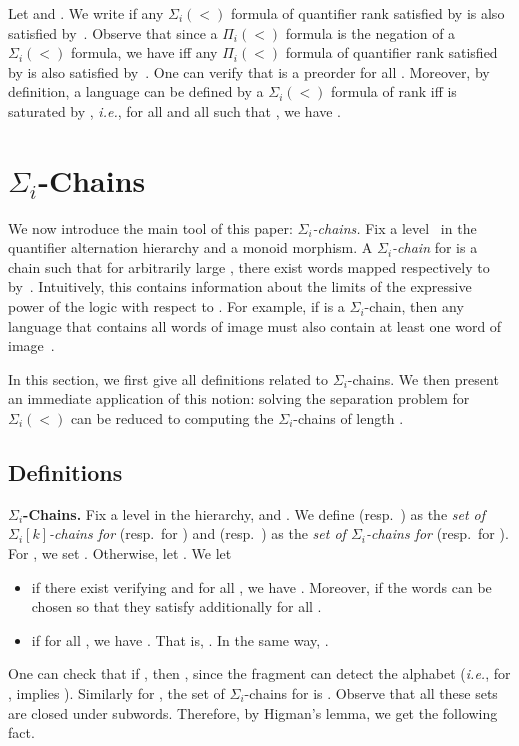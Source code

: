 \documentclass[envcountsame]{llncs}
\newcommand{\sic}[1]{\ensuremath{\Sigma_{#1}}\xspace}
\newcommand{\siw}[1]{\ensuremath{\Sigma_{#1}(<)}\xspace}
\newcommand{\piw}[1]{\ensuremath{\Pi_{#1}(<)}\xspace}
\newcommand\chain{chain\xspace}
\newcommand\qchain[1]{\ensuremath{\sic{#1}}-chain\xspace}
\newcommand\qchains[1]{\ensuremath{\sic{#1}}-chains\xspace}
\newcommand\qChains[1]{\ensuremath{\sic{#1}}-Chains\xspace}
\newcommand\qpchains[2]{\ensuremath{\sic{#1}[#2]}-chains\xspace}
\newcommand\ichain{\qchain{i}}
\newcommand\ichains{\qchains{i}}
\newcommand\iChains{\qChains{i}}
\newcommand\ikchains{\qpchains{i}{k}}
\begin{document}
\medskip
\noindent {\bf Preorder for \siw{i}.} Let  and . We write  if any \siw{i} formula of quantifier rank 
satisfied by  is also satisfied by~. Observe that since a \piw{i}
formula is the negation of a \siw{i} formula, we have  iff any \piw{i} formula of quantifier rank  satisfied by 
is also satisfied by~. One can verify that  is a preorder for
all . Moreover, by definition, a language  can be defined by a \siw{i}
formula of rank  iff  is saturated by , \emph{i.e.}, for all  and all  such that , we have .  


\section{\iChains}
\label{sec:chains}
We now introduce the main tool of this paper:
\emph{\ichains.} Fix a level~ in the quantifier alternation
hierarchy and  a monoid morphism. A
\emph{\ichain } for  is a \chain  such
that for arbitrarily large , there exist words  mapped respectively to  by~. Intuitively, this contains information about the
limits of the expressive power of the logic  with respect to
. For example, if  is a \ichain, then any 
language that contains all words of image  must also contain at
least one word of image~.

\smallskip
In this section, we first give all definitions related to \ichains. We then
present an immediate application of this notion: solving the separation problem
for \siw{i} can be reduced to computing the \ichains of length .

\subsection{Definitions}

\noindent
{\bf \iChains.} Fix  a level in the hierarchy,  and . We define  (resp.\ ) as
the \emph{set of \ikchains for } (resp.\ for ) and
 (resp.\ ) as
the \emph{set of \ichains for } (resp.\ for ). For , we set . Otherwise,
let . We let

\begin{itemize}
\item  if there exist 
  verifying  and for all
  , we have . Moreover,  if
  the words  can be chosen so that they satisfy additionally
   for all .
\item  if for all , we have . That is, . In the same
  way, .
\end{itemize}

One can check that if , then
, since  the fragment  can
detect the alphabet (\emph{i.e.}, for , 
implies ). Similarly for , the set
of \ichains for  is . Observe that all these sets are closed under subwords. Therefore, by Higman's lemma, we get the
following fact.
\end{document}
